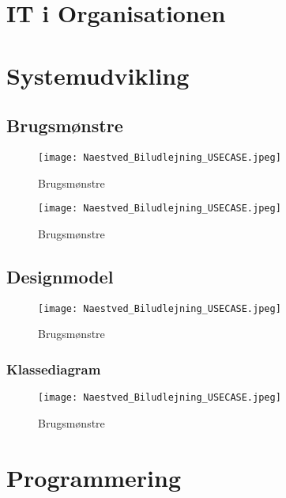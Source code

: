 \documentclass[11pt]{article}
\begin{document}
\section*{IT i Organisationen}

\section*{Systemudvikling}

\subsection*{Brugsmønstre}

\begin{figure}
  \centering
  \texttt{[image: Naestved\_Biludlejning\_USECASE.jpeg]}
  \caption{Brugsmønstre}
  \label{fig:Use-case diagram}
\end{figure}

\begin{figure}
  \centering
  \texttt{[image: Naestved\_Biludlejning\_USECASE.jpeg]}
  \caption{Brugsmønstre}
  \label{fig:Use-case diagram}
\end{figure}

\subsection*{Designmodel}

\begin{figure}
  \centering
  \texttt{[image: Naestved\_Biludlejning\_USECASE.jpeg]}
  \caption{Brugsmønstre}
  \label{fig:Use-case diagram}
\end{figure}

\subsubsection*{Klassediagram}

\begin{figure}
  \centering
  \texttt{[image: Naestved\_Biludlejning\_USECASE.jpeg]}
  \caption{Brugsmønstre}
  \label{fig:Use-case diagram}
\end{figure}

\section*{Programmering}
\end{document}
